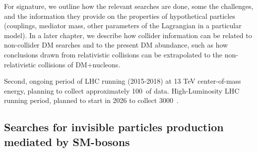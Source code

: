 For signature, we outline how the relevant searches are done, some the challenges, and the information they provide on the properties of hypothetical particles (couplings, mediator mass, other parameters of the Lagrangian in a particular model). 
In a later chapter, we describe how collider information can be related to non-collider DM searches and to the present DM abundance, such as how conclusions drawn from relativistic collisions can be extrapolated to the non-relativistic collisions of DM+nucleons. 

\begin{marginnote}[]
 {Second, ongoing period of LHC running (2015-2018) at 13 TeV center-of-mass energy, planning to collect approximately 100~\ifb of data.}
 {High-Luminosity LHC running period, planned to start in 2026 to collect 3000~\ifb.}
\end{marginnote}


\subsection{Searches for invisible particles production mediated by SM-bosons}
\label{sec:results_ZHSearches}


